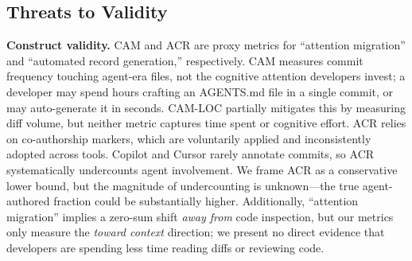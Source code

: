 \documentclass[12pt]{article}
\begin{document}
\subsection{Threats to Validity}

\textbf{Construct validity.} CAM and ACR are proxy metrics for ``attention migration'' and ``automated record generation,'' respectively. CAM measures commit frequency touching agent-era files, not the cognitive attention developers invest; a developer may spend hours crafting an AGENTS.md file in a single commit, or may auto-generate it in seconds. CAM-LOC partially mitigates this by measuring diff volume, but neither metric captures time spent or cognitive effort. ACR relies on co-authorship markers, which are voluntarily applied and inconsistently adopted across tools. Copilot and Cursor rarely annotate commits, so ACR systematically undercounts agent involvement. We frame ACR as a conservative lower bound, but the magnitude of undercounting is unknown---the true agent-authored fraction could be substantially higher. Additionally, ``attention migration'' implies a zero-sum shift \textit{away from} code inspection, but our metrics only measure the \textit{toward context} direction; we present no direct evidence that developers are spending less time reading diffs or reviewing code.
\end{document}
